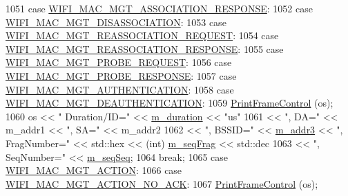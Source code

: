 \begin{DoxyCode}
1051     \textcolor{keywordflow}{case} \hyperlink{namespacens3_a9318472db39b35b2092de5c721e6ab0aa82d523f7f07c3247cd5bbc8541f14160}{WIFI\_MAC\_MGT\_ASSOCIATION\_RESPONSE}:
1052     \textcolor{keywordflow}{case} \hyperlink{namespacens3_a9318472db39b35b2092de5c721e6ab0aa9583e9bca90d8b192b481160bc378ce4}{WIFI\_MAC\_MGT\_DISASSOCIATION}:
1053     \textcolor{keywordflow}{case} \hyperlink{namespacens3_a9318472db39b35b2092de5c721e6ab0aaa860608499e0aaf37a677fb2a84dd70d}{WIFI\_MAC\_MGT\_REASSOCIATION\_REQUEST}:
1054     \textcolor{keywordflow}{case} \hyperlink{namespacens3_a9318472db39b35b2092de5c721e6ab0aaf9e403598652840f9b0ae2e9599381fd}{WIFI\_MAC\_MGT\_REASSOCIATION\_RESPONSE}:
1055     \textcolor{keywordflow}{case} \hyperlink{namespacens3_a9318472db39b35b2092de5c721e6ab0aa11d705015f8c807ce9b77d424bba7d9a}{WIFI\_MAC\_MGT\_PROBE\_REQUEST}:
1056     \textcolor{keywordflow}{case} \hyperlink{namespacens3_a9318472db39b35b2092de5c721e6ab0aaecc5450edfe73fbd26f9bcf229bcaa0d}{WIFI\_MAC\_MGT\_PROBE\_RESPONSE}:
1057     \textcolor{keywordflow}{case} \hyperlink{namespacens3_a9318472db39b35b2092de5c721e6ab0aa54204ed25630f0047d08e8fd14f43bdc}{WIFI\_MAC\_MGT\_AUTHENTICATION}:
1058     \textcolor{keywordflow}{case} \hyperlink{namespacens3_a9318472db39b35b2092de5c721e6ab0aad627704a0ebb3aff9ddac56dd83c0fdd}{WIFI\_MAC\_MGT\_DEAUTHENTICATION}:
1059       \hyperlink{classns3_1_1WifiMacHeader_ab0a49be8ed03287c89d128b4c0f1a09f}{PrintFrameControl} (os);
1060       os << \textcolor{stringliteral}{" Duration/ID="} << \hyperlink{classns3_1_1WifiMacHeader_a7adb3f465d0b7474cdceefc8ab993513}{m\_duration} << \textcolor{stringliteral}{"us"}
1061          << \textcolor{stringliteral}{", DA="} << m\_addr1 << \textcolor{stringliteral}{", SA="} << m\_addr2
1062          << \textcolor{stringliteral}{", BSSID="} << \hyperlink{classns3_1_1WifiMacHeader_adc7482e08ca2c700dce938d9d051bc43}{m\_addr3} << \textcolor{stringliteral}{", FragNumber="} << std::hex << (int) 
      \hyperlink{classns3_1_1WifiMacHeader_a9281a55cbfc7a2ba57ecbeeec56fae07}{m\_seqFrag} << std::dec
1063          << \textcolor{stringliteral}{", SeqNumber="} << \hyperlink{classns3_1_1WifiMacHeader_a322d3a600f03f35b13e5e1f86b1b55e6}{m\_seqSeq};
1064       \textcolor{keywordflow}{break};
1065     \textcolor{keywordflow}{case} \hyperlink{namespacens3_a9318472db39b35b2092de5c721e6ab0aa74bb4e69419120fcfa3a204b91e34600}{WIFI\_MAC\_MGT\_ACTION}:
1066     \textcolor{keywordflow}{case} \hyperlink{namespacens3_a9318472db39b35b2092de5c721e6ab0aabfee98111155a3b03a4debe2bbee3fea}{WIFI\_MAC\_MGT\_ACTION\_NO\_ACK}:
1067       \hyperlink{classns3_1_1WifiMacHeader_ab0a49be8ed03287c89d128b4c0f1a09f}{PrintFrameControl} (os);

\end{DoxyCode}
